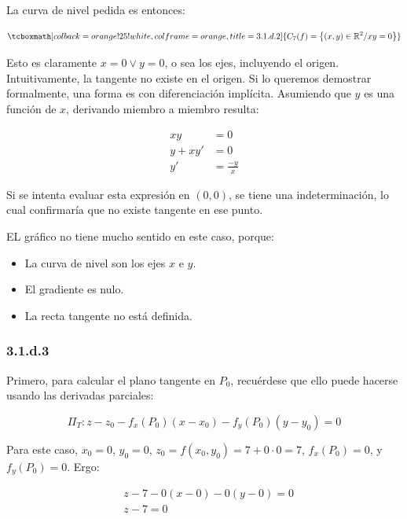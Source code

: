 \documentclass{article}
\renewcommand{\Bbb}{\mathbb}
\begin{document}
La curva de nivel pedida es entonces:

\begin{equation}
\tcboxmath[colback=orange!25!white,colframe=orange,title=3.1.d.2]
{
C_{7}(f) = \left\{ (x,y) \in \Bbb R^2 / xy = 0 \right\}
}
\end{equation}

Esto es claramente $x = 0 \vee y = 0$, o sea los ejes, incluyendo el origen. Intuitivamente, la tangente no existe en el origen. Si lo queremos demostrar formalmente, una forma es con diferenciación implícita. Asumiendo que $y$ es una función de $x$, derivando miembro a miembro resulta:

\begin{subequations}
\begin{align}
xy &= 0 \\
y + x y' &= 0 \\
y' &= \frac{-y}{x}
\end{align}
\end{subequations}

Si se intenta evaluar esta expresión en $(0,0)$, se tiene una indeterminación, lo cual confirmaría que no existe tangente en ese punto.

EL gráfico no tiene mucho sentido en este caso, porque:
\begin{itemize}
\item La curva de nivel son los ejes $x$ e $y$.
\item El gradiente es nulo.
\item La recta tangente no está definida.
\end{itemize}

\subsubsection*{3.1.d.3}
\label{subsubsec:3.1.d.3}

Primero, para calcular el plano tangente en $P_0$, recuérdese que ello puede hacerse usando las derivadas parciales:

\begin{equation}
\Pi_T: z-z_0 - f_x(P_0) (x-x_0) - f_y(P_0) (y-y_0) = 0
\end{equation}

Para este caso, $x_0 = 0$, $y_0 = 0$, $z_0 = f(x_0,y_0) = 7 + 0 \cdot 0 = 7$, $f_x(P_0) = 0$, y $f_y(P_0) = 0$. Ergo:

\begin{subequations}
\begin{align}
& z-7 - 0 (x-0) - 0 (y-0) = 0 \\
& z-7 = 0
\end{align}
\end{subequations}
\end{document}
